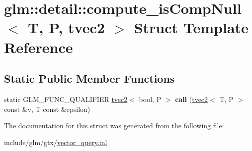 \hypertarget{structglm_1_1detail_1_1compute__isCompNull_3_01T_00_01P_00_01tvec2_01_4}{}\section{glm\+:\+:detail\+:\+:compute\+\_\+is\+Comp\+Null$<$ T, P, tvec2 $>$ Struct Template Reference}
\label{structglm_1_1detail_1_1compute__isCompNull_3_01T_00_01P_00_01tvec2_01_4}
\subsection*{Static Public Member Functions}
\begin{DoxyCompactItemize}
\item 
\mbox{\label{structglm_1_1detail_1_1compute__isCompNull_3_01T_00_01P_00_01tvec2_01_4_ac0a15e2120dff188297158f1aa716a0e}} 
static G\+L\+M\+\_\+\+F\+U\+N\+C\+\_\+\+Q\+U\+A\+L\+I\+F\+I\+ER \hyperlink{structglm_1_1tvec2}{tvec2}$<$ bool, P $>$ {\bfseries call} (\hyperlink{structglm_1_1tvec2}{tvec2}$<$ T, P $>$ const \&v, T const \&epsilon)
\end{DoxyCompactItemize}


The documentation for this struct was generated from the following file\+:\begin{DoxyCompactItemize}
\item 
include/glm/gtx/\hyperlink{vector__query_8inl}{vector\+\_\+query.\+inl}\end{DoxyCompactItemize}
